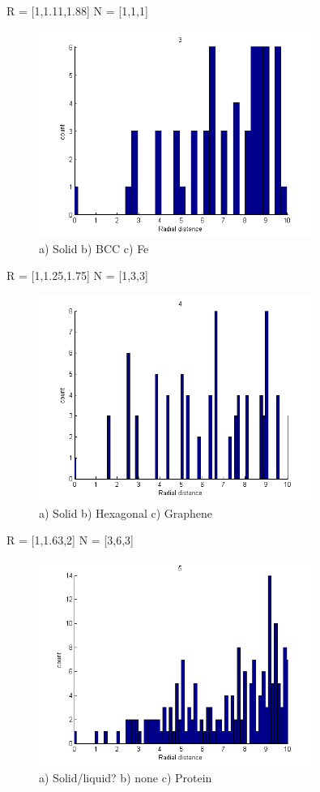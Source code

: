 \documentclass[paper=a4, fontsize=12pt]{scrartcl} %
\numberwithin{equation}{section} %
\numberwithin{figure}{section} %
\numberwithin{table}{section} %
\begin{document}
R = [1,1.11,1.88]
N = [1,1,1]
\begin{figure}[H]
  \centering
      \includegraphics[width=0.8\textwidth]{3.png}
  \caption{a) Solid b) BCC c) Fe}
\end{figure}
R = [1,1.25,1.75]
N = [1,3,3]
\begin{figure}[H]
  \centering
      \includegraphics[width=0.8\textwidth]{4.png}
  \caption{a) Solid b) Hexagonal c) Graphene}
\end{figure}
R = [1,1.63,2]
N = [3,6,3]
\begin{figure}[H]
  \centering
      \includegraphics[width=0.8\textwidth]{5.png}
  \caption{a) Solid/liquid? b) none c) Protein}
\end{figure}
\end{document}
